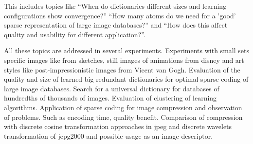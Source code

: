 This includes topics like ``When do dictionaries different sizes and learning configurations show convergence?'' 
``How many atoms do we need  for a 'good' sparse representation of large image databases?'' 
 and ``How does this affect quality and usability for different application?''. 

All these topics are addressed in several experiments.
Experiments with small sets specific images like from sketches, still images of animations from disney and art styles like post-impressionistic images from Vicent van Gogh.
Evaluation of the quality and size of learned big redundant dictionaries for optimal sparse coding of large image databases.
Search for a universal dictionary for databases of hundredths of thousands of images.
Evaluation of clustering of learning algorithms. 
Application of sparse coding for image compression and observation of problems. Such as encoding time, quality benefit.
Comparison of compression with discrete cosine transformation approaches in jpeg and discrete wavelets transformation of jepg2000 and possible usage as an image descriptor.







